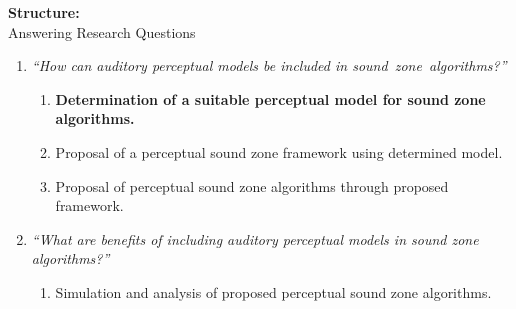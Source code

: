 \documentclass[aspectratio=169]{beamer}
\begin{document}
\begin{frame}{\textbf{Structure:}\\ Answering Research Questions}
    \begin{enumerate}
        \item {\textit{``How can auditory perceptual models be included in sound~zone~algorithms?''}}
            \vspace{7pt}
            \begin{enumerate}
                \item \textbf{Determination of a suitable perceptual model for sound zone algorithms.}
                \vspace{7pt}
                \item Proposal of a perceptual sound zone framework using determined model. 
                \vspace{7pt}
                \item Proposal of perceptual sound zone algorithms through proposed framework.
                \vspace{7pt}
            \end{enumerate}
        \item {\textit{``What are benefits of including auditory perceptual models in sound zone algorithms?''}}
            \vspace{-5pt}
            \begin{enumerate}
                \item Simulation and analysis of proposed perceptual sound zone algorithms.
            \end{enumerate}
    \end{enumerate}
\end{frame}
\end{document}
